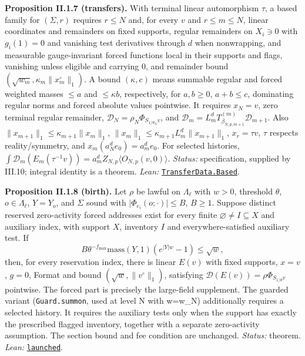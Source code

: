 \documentclass[
  letterpaper,
  11pt]{article}
\begin{document}
\textbf{Proposition II.1.7 (transfers).} With terminal linear
automorphism \(\tau\), a based family for \((\Sigma,r)\) requires
\(r\le N\) and, for every \(v\) and \(r\le m\le N\), linear coordinates
and remainders on fixed supports, regular remainders on \(X_i\ni0\) with
\(g_i(1)=0\) and vanishing test derivatives through \(d\) when
nonwrapping, and measurable gauge-invariant forced functions local in
their supports and flags, vanishing unless eligible and carrying \(0\),
and remainder bound \((\sqrt{w_m},\kappa_m\lVert x_m^\circ\rVert_1)\). A
bound \((\kappa,c)\) means summable regular and forced weighted masses
\(\le a\) and \(\le\kappa b\), respectively, for \(a,b\ge0\),
\(a+b\le c\), dominating regular norms and forced absolute values
pointwise. It requires \(x_N=v\), zero terminal regular remainder,
\(\mathcal D_N=\rho_N\Phi_{S_{1/\theta_N}v}\), and
\(\mathcal D_m=L_m^dT^{(m)}_{\beta_{N,p,m+1}}\mathcal D_{m+1}\). Also
\(\lVert x_{m+1}\rVert_1\le\kappa_{m+1}\lVert x_m\rVert_1\),
\(\lVert x_m\rVert_1\le\kappa_{m+1}L_m^d\lVert x_{m+1}\rVert_1\),
\(x_r=\tau v\), \(\tau\) respects reality/symmetry, and
\(x_m(a_N^de_0)=a_m^de_0\). For selected histories,
\(\int\mathcal D_m(E_m(\tau^{-1}v))=a_m^dZ_{N,p}\langle O_{N,p}(v,0)\rangle\).
\emph{Status:} specification, supplied by III.10; integral identity is a
theorem. \emph{Lean:}
\href{https://github.com/yang-mills-group/OpenAI-YM-20261028/blob/3456e5e75cf8d4cd558955a5c7638fba2d68f464/YM/Source/Insertion.lean\#L89-L114}{\texttt{TransferData.Based}}.

\textbf{Proposition II.1.8 (birth).} Let \(\rho\) be lawful on
\(\Lambda_\ell\) with \(w>0\), threshold \(\theta\),
\(o\in\Lambda_\ell\), \(Y=Y_o\), and \(\Sigma\) sound with
\(\lvert\Phi_{e_i}(o;\cdot)\rvert\le B\), \(B\ge1\). Suppose distinct
reserved zero-activity forced addresses exist for every finite
\(\varnothing\ne I\subseteq X\) and auxiliary index, with support \(X\),
inventory \(I\) and everywhere-satisfied auxiliary test. If
\[B\theta^{-f_{\max}}\mathrm{mass}(Y,1)(e^{\lvert Y\rvert w}-1)\le\sqrt w,\]
then, for every reservation index, there is linear \(E(v)\) with fixed
supports, \(x=v\), \(g=0\), Format and bound
\((\sqrt w,\lVert v^\circ\rVert_1)\), satisfying
\(\mathcal D(E(v))=\rho\Phi_{S_{1/\theta}v}\) pointwise. The forced part
is precisely the large-field supplement. The guarded variant
(\texttt{Guard.summon}, used at level N with w=w\_N) additionally
requires a selected history. It requires the auxiliary tests only when
the support has exactly the prescribed flagged inventory, together with
a separate zero-activity assumption. The section bound and fee condition
are unchanged. \emph{Status:} theorem. \emph{Lean:}
\href{https://github.com/yang-mills-group/OpenAI-YM-20261028/blob/3456e5e75cf8d4cd558955a5c7638fba2d68f464/YM/Extra/SOURCE_HISTORIES/Birth.lean\#L116-L161}{\texttt{launched}}.
\end{document}

